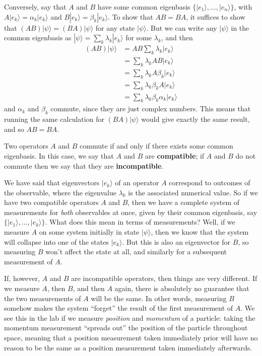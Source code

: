 \documentclass[fleqn]{article}
\newenvironment{idea}{\noindent}{\medskip}
\begin{document}
Conversely, say that \(A\) and \(B\) have some common eigenbasis \(\{|e_1\rangle,\ldots,|e_n\rangle\}\), with \(A|e_k\rangle=\alpha_k|e_k\rangle\) and \(B|e_k\rangle=\beta_k|e_k\rangle\).
To show that \(AB=BA\), it suffices to show that \((AB)|\psi\rangle=(BA)|\psi\rangle\) for any state \(|\psi\rangle\).
But we can write any \(|\psi\rangle\) in the common eigenbasis as \(|\psi\rangle=\sum_k\lambda_k|e_k\rangle\) for some \(\lambda_k\), and then
\[
  \begin{aligned}
    (AB)|\psi\rangle
    &= AB\sum_k\lambda_k|e_k\rangle
  \\&= \sum_k\lambda_k AB|e_k\rangle
  \\&= \sum_k\lambda_k A\beta_k|e_k\rangle
  \\&= \sum_k\lambda_k \beta_k A|e_k\rangle
  \\&= \sum_k\lambda_k \beta_k\alpha_k|e_k\rangle
  \end{aligned}
\]
and \(\alpha_k\) and \(\beta_k\) commute, since they are just complex numbers.
This means that running the same calculation for \((BA)|\psi\rangle\) would give exactly the same result, and so \(AB=BA\).

\begin{idea}
Two operators \(A\) and \(B\) commute if and only if there exists some common eigenbasis.
In this case, we say that \(A\) and \(B\) are \textbf{compatible}; if \(A\) and \(B\) do not commute then we say that they are \textbf{incompatible}.

\end{idea}

We have said that eigenvectors \(|e_k\rangle\) of an operator \(A\) correspond to outcomes of the observable, where the eigenvalue \(\lambda_k\) is the associated numerical value.
So if we have two compatible operators \(A\) and \(B\), then we have a complete system of measurements for \emph{both} observables at once, given by their common eigenbasis, say \(\{|e_1\rangle,\ldots,|e_k\rangle\}\).
What does this mean in terms of measurements?
Well, if we measure \(A\) on some system initially in state \(|\psi\rangle\), then we know that the system will collapse into one of the states \(|e_k\rangle\).
But this is also an eigenvector for \(B\), so measuring \(B\) won't affect the state at all, and similarly for a subsequent measurement of \(A\).

If, however, \(A\) and \(B\) are incompatible operators, then things are very different.
If we measure \(A\), then \(B\), and then \(A\) again, there is absolutely no guarantee that the two measurements of \(A\) will be the same.
In other words, measuring \(B\) somehow makes the system ``forget'' the result of the first measurement of \(A\).
We see this in the lab if we measure \emph{position} and \emph{momentum} of a particle: taking the momentum measurement ``spreads out'' the position of the particle throughout space, meaning that a position measurement taken immediately prior will have no reason to be the same as a position measurement taken immediately afterwards.
\end{document}
